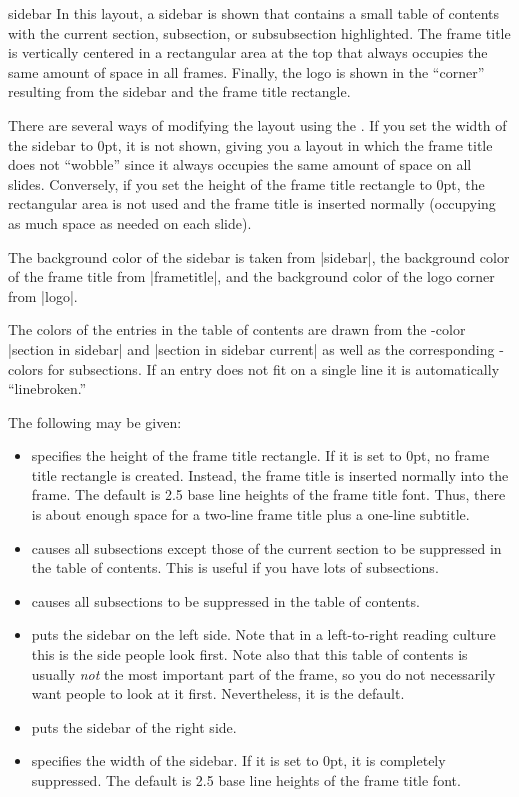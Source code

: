 \begin{outerthemeexample}{sidebar}
  In this layout, a sidebar is shown that contains a small table of contents with the current section, subsection, or subsubsection highlighted. The frame title is vertically centered in a rectangular area at the top that always occupies the same amount of space in all frames. Finally, the logo is shown in the ``corner'' resulting from the sidebar and the frame title rectangle.

  There are several ways of modifying the layout using the . If you set the width of the sidebar to 0pt, it is not shown, giving you a layout in which the frame title does not ``wobble'' since it always occupies the same amount of space on all slides. Conversely, if you set the height of the frame title rectangle to 0pt, the rectangular area is not used and the frame title is inserted normally (occupying as much space as needed on each slide).

  The background color of the sidebar is taken from |sidebar|, the background color of the frame title from |frametitle|, and the background color of the logo corner from |logo|.

  The colors of the entries in the table of contents are drawn from the \beamer-color |section in sidebar| and |section in sidebar current| as well as the corresponding \beamer-colors for subsections. If an entry does not fit on a single line it is automatically ``linebroken.''

  The following  may be given:
  \begin{itemize}
  \item
     specifies the height of the frame title rectangle. If it is set to 0pt, no frame title rectangle is created. Instead, the frame title is inserted normally into the frame. The default is 2.5 base line heights of the frame title font. Thus, there is about enough space for a two-line frame title plus a one-line subtitle.
  \item
     causes all subsections except those of the current section to be suppressed in the table of contents. This is useful if you have lots of subsections.
  \item
     causes all subsections to be suppressed in the table of contents.
  \item
     puts the sidebar on the left side. Note that in a left-to-right reading culture this is the side people look first. Note also that this table of contents is usually \emph{not} the most important part of the frame, so you do not necessarily want people to look at it first. Nevertheless, it is the default.
  \item
     puts the sidebar of the right side.
  \item
     specifies the width of the sidebar. If it is set to 0pt, it is completely suppressed. The default is 2.5 base line heights of the frame title font.
  \end{itemize}
\end{outerthemeexample}

